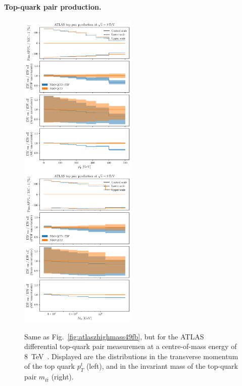 \paragraph{Top-quark pair production.}


\begin{figure}[!t]
    \centering
    \includegraphics[width=0.5\textwidth]{figures/pineappl_ATLAS_TTB_DIFF_8TEV_LJ_TPT}%
    \includegraphics[width=0.5\textwidth]{figures/pineappl_ATLAS_TTB_DIFF_8TEV_LJ_TTM}
    \caption{Same as Fig.~\ref{fig:atlaszhighmass49fb}, but for the ATLAS
      differential top-quark pair measuremen at a centre-of-mass energy of
      8~TeV~\cite{Aad:2015mbv}. Displayed are the distributions in the
      transverse momentum of the top quark $p_T^t$ (left), and in the invariant
      mass of the top-quark pair $m_{t\bar{t}}$ (right).}
    \label{fig:atlastop}
\end{figure}



